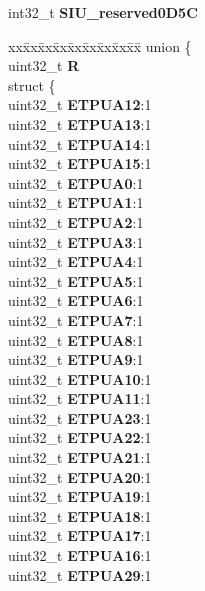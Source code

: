 \begin{DoxyCompactItemize}
\begin{tabbing}
\end{tabbing}\item 
\mbox{\label{structSIU__tag_aea370cb6d426bbe71e5cc8c3a72dcb2b}} 
int32\+\_\+t {\bfseries S\+I\+U\+\_\+reserved0\+D5C}
\item 
\mbox{\label{structSIU__tag_a04e41ee3933b0bc548360f1e68b25402}} 
\begin{tabbing}
xx\=xx\=xx\=xx\=xx\=xx\=xx\=xx\=xx\=\kill
union \{\\
\>uint32\_t {\bfseries R}\\
\>struct \{\\
\>\>uint32\_t {\bfseries ETPUA12}:1\\
\>\>uint32\_t {\bfseries ETPUA13}:1\\
\>\>uint32\_t {\bfseries ETPUA14}:1\\
\>\>uint32\_t {\bfseries ETPUA15}:1\\
\>\>uint32\_t {\bfseries ETPUA0}:1\\
\>\>uint32\_t {\bfseries ETPUA1}:1\\
\>\>uint32\_t {\bfseries ETPUA2}:1\\
\>\>uint32\_t {\bfseries ETPUA3}:1\\
\>\>uint32\_t {\bfseries ETPUA4}:1\\
\>\>uint32\_t {\bfseries ETPUA5}:1\\
\>\>uint32\_t {\bfseries ETPUA6}:1\\
\>\>uint32\_t {\bfseries ETPUA7}:1\\
\>\>uint32\_t {\bfseries ETPUA8}:1\\
\>\>uint32\_t {\bfseries ETPUA9}:1\\
\>\>uint32\_t {\bfseries ETPUA10}:1\\
\>\>uint32\_t {\bfseries ETPUA11}:1\\
\>\>uint32\_t {\bfseries ETPUA23}:1\\
\>\>uint32\_t {\bfseries ETPUA22}:1\\
\>\>uint32\_t {\bfseries ETPUA21}:1\\
\>\>uint32\_t {\bfseries ETPUA20}:1\\
\>\>uint32\_t {\bfseries ETPUA19}:1\\
\>\>uint32\_t {\bfseries ETPUA18}:1\\
\>\>uint32\_t {\bfseries ETPUA17}:1\\
\>\>uint32\_t {\bfseries ETPUA16}:1\\
\>\>uint32\_t {\bfseries ETPUA29}:1\\

\end{tabbing}
\end{DoxyCompactItemize}
